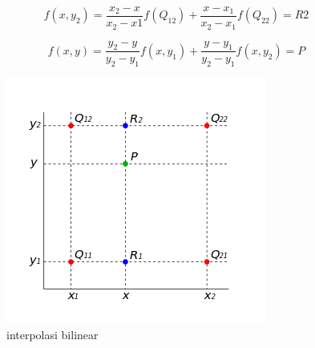\begin{equation}
	\label{bilin_x2}
	f(x,y_2) = \frac{x_2 - x}{x_2 - x1} f(Q_12) + \frac{x - x_1}{x_2 - x_1} f(Q_22) = R2
\end{equation}

\begin{equation}
	\label{bilin_y}
	f(x,y) = \frac{y_2 - y}{y_2 - y_1} f(x, y_1) + \frac{y - y_1}{y_2 - y_1} f(x, y_2) = P
\end{equation}

\begin{figure}[H]
	\centering
	\includegraphics[width=.7\textwidth]{gambar/bilinear_interpolation}
	\caption{interpolasi bilinear}
	\label{Gambar:bilin_ilust}
\end{figure}


